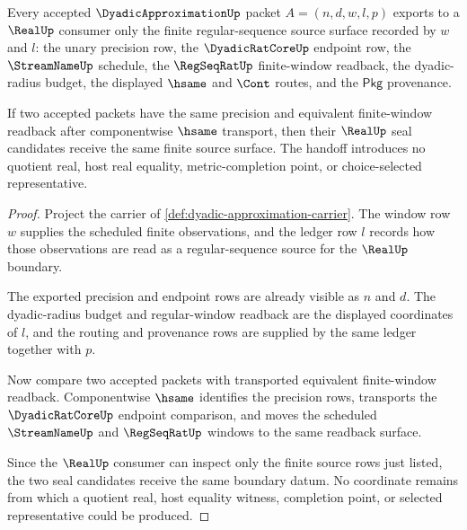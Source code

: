 \begin{theorem}
\label{thm:dyadic-approximation-real-seal-handoff}
Every accepted $\DyadicApproximationUp$ packet $A=(n,d,w,l,p)$ exports to a $\RealUp$ consumer only the finite regular-sequence source surface recorded by $w$ and $l$: the unary precision row, the $\DyadicRatCoreUp$ endpoint row, the $\StreamNameUp$ schedule, the $\RegSeqRatUp$ finite-window readback, the dyadic-radius budget, the displayed $\hsame$ and $\Cont$ routes, and the $\mathsf{Pkg}$ provenance.

If two accepted packets have the same precision and equivalent finite-window readback after componentwise $\hsame$ transport, then their $\RealUp$ seal candidates receive the same finite source surface. The handoff introduces no quotient real, host real equality, metric-completion point, or choice-selected representative.
\end{theorem}
\begin{proof}
Project the carrier of \autoref{def:dyadic-approximation-carrier}. The window row $w$ supplies the scheduled finite observations, and the ledger row $l$ records how those observations are read as a regular-sequence source for the $\RealUp$ boundary.

The exported precision and endpoint rows are already visible as $n$ and $d$. The dyadic-radius budget and regular-window readback are the displayed coordinates of $l$, and the routing and provenance rows are supplied by the same ledger together with $p$.

Now compare two accepted packets with transported equivalent finite-window readback. Componentwise $\hsame$ identifies the precision rows, transports the $\DyadicRatCoreUp$ endpoint comparison, and moves the scheduled $\StreamNameUp$ and $\RegSeqRatUp$ windows to the same readback surface.

Since the $\RealUp$ consumer can inspect only the finite source rows just listed, the two seal candidates receive the same boundary datum. No coordinate remains from which a quotient real, host equality witness, completion point, or selected representative could be produced.
\end{proof}

